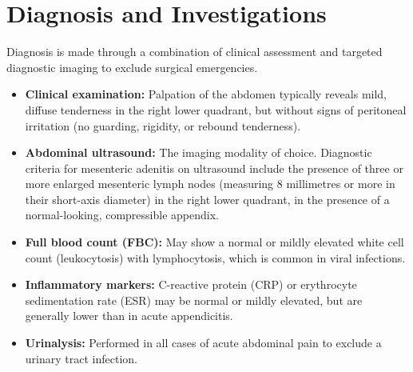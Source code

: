 \section*{Diagnosis and Investigations}
Diagnosis is made through a combination of clinical assessment and targeted diagnostic imaging to exclude surgical emergencies.
\begin{itemize}
    \item \textbf{Clinical examination:} Palpation of the abdomen typically reveals mild, diffuse tenderness in the right lower quadrant, but without signs of peritoneal irritation (no guarding, rigidity, or rebound tenderness).
    \item \textbf{Abdominal ultrasound:} The imaging modality of choice. Diagnostic criteria for mesenteric adenitis on ultrasound include the presence of three or more enlarged mesenteric lymph nodes (measuring 8 millimetres or more in their short-axis diameter) in the right lower quadrant, in the presence of a normal-looking, compressible appendix.
    \item \textbf{Full blood count (FBC):} May show a normal or mildly elevated white cell count (leukocytosis) with lymphocytosis, which is common in viral infections.
    \item \textbf{Inflammatory markers:} C-reactive protein (CRP) or erythrocyte sedimentation rate (ESR) may be normal or mildly elevated, but are generally lower than in acute appendicitis.
    \item \textbf{Urinalysis:} Performed in all cases of acute abdominal pain to exclude a urinary tract infection.
\end{itemize}

